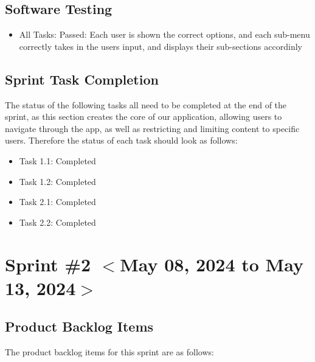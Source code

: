 \documentclass{scrreprt}
\begin{document}
% 
\subsection{Software Testing}

\begin{itemize}
    \item All Tasks: Passed: Each user is shown the correct options, and each sub-menu correctly takes in the users input, and displays their sub-sections accordinly
\end{itemize}
% 
\subsection{Sprint Task Completion}

The status of the following tasks all need to be completed at the end of the sprint, as this section creates the core of our application, allowing users to navigate through the app, as well as restricting and limiting content to specific users. Therefore the status of each task should look as follows:

\begin{itemize}
    \item Task 1.1: Completed
    \item Task 1.2: Completed
    \item Task 2.1: Completed
    \item Task 2.2: Completed
\end{itemize}

% 
% 
\section{Sprint \#2 $<$May 08, 2024 to May 13, 2024$>$}

% 
\subsection{Product Backlog Items}
The product backlog items for this sprint are as follows:
\end{document}
